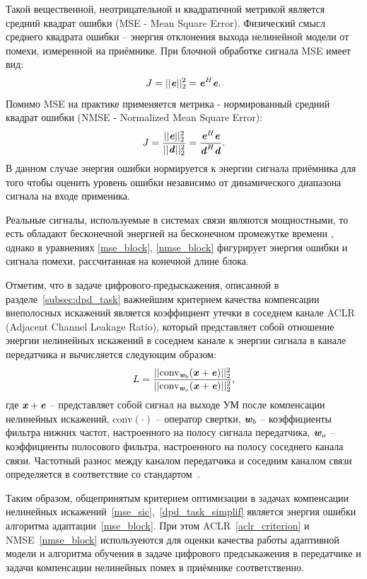 Такой вещественной, неотрицательной и квадратичной метрикой является средний квадрат ошибки (MSE - Mean Square Error). Физический смысл среднего квадрата ошибки -- энергия отклонения выхода нелинейной модели от помехи, измеренной на приёмнике. При блочной обработке сигнала MSE имеет вид:
\begin{equation}
	J=||\textbf{\textit{e}}||_2^2=\textbf{\textit{e}}^H\textbf{\textit{e}}.
	\label{mse_block}
\end{equation}
Помимо MSE на практике применяется метрика - нормированный средний квадрат ошибки (NMSE - Normalized Mean Square Error):
\begin{equation}
	J=\frac{||\textbf{\textit{e}}||_2^2}{||\textbf{\textit{d}}||_2^2}=\frac{\textbf{\textit{e}}^H\textbf{\textit{e}}}{\textbf{\textit{d}}^H\textbf{\textit{d}}}.
	\label{nmse_block}
\end{equation}
В данном случае энергия ошибки нормируется к энергии сигнала приёмника для того чтобы оценить уровень ошибки независимо от динамического диапазона сигнала на входе применика. 

Реальные сигналы, используемые в системах связи \cite{sklyar_dig_telecom} являются мощностными, то есть обладают бесконечной энергией на бесконечном промежутке времени , однако в уравнениях \eqref{mse_block}, \eqref{nmse_block} фигурирует энергия ошибки и сигнала помехи, рассчитанная на конечной длине блока.

Отметим, что в задаче цифрового-предыскажения, описанной в разделе~\ref{subsec:dpd_task} важнейшим критерием качества компенсации внеполосных искажений является коэффициент утечки в соседнем канале ACLR (Adjacent Channel Leakage Ratio), который представляет собой отношение энергии нелинейных искажений в соседнем канале к энергии сигнала в канале передатчика и вычисляется следующим образом:
\begin{equation}
	L=\frac{||\text{conv}_{\textbf{\textit{w}}_b}(\textbf{\textit{x}}+\textbf{\textit{e}})||_2^2}{||\text{conv}_{\textbf{\textit{w}}_o}(\textbf{\textit{x}}+\textbf{\textit{e}})||_2^2},
	\label{aclr_criterion}
\end{equation}
где $\textbf{\textit{x}}+\textbf{\textit{e}}$ -- представляет собой сигнал на выходе УМ после компенсации нелинейных искажений, $\text{conv}(\cdot)$ -- оператор свертки, $\textbf{\textit{w}}_b$ -- коэффициенты фильтра нижних частот, настроенного на полосу сигнала передатчика, $\textbf{\textit{w}}_o$ -- коэффициенты полосового фильтра, настроенного на полосу соседнего канала связи. Частотный разнос между каналом передатчика и соседним каналом связи определяется в соответствие со стандартом~\cite{3gpp_36_804}. 

Таким образом, общепринятым критерием оптимизации в задачах компенсации нелинейных искажений~\eqref{mse_sic},~\eqref{dpd_task_simplif} является энергия ошибки алгоритма адаптации~\eqref{mse_block}. При этом ACLR~\eqref{aclr_criterion} и NMSE~\eqref{nmse_block} используеются для оценки качества работы адаптивной модели и алгоритма обучения в задаче цифрового предсыкажения в передатчике и задачи компенсации нелинейных помех в приёмнике соответственно.

